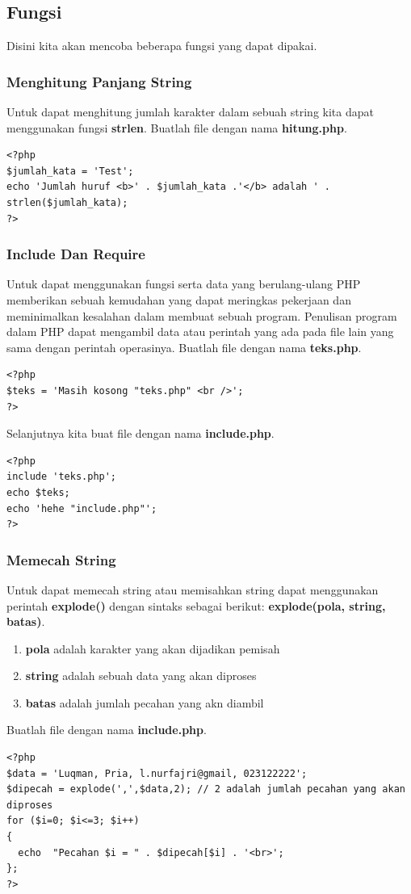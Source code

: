 \subsection{Fungsi}
Disini kita akan mencoba beberapa fungsi yang dapat dipakai.
\subsubsection{Menghitung Panjang String}
Untuk dapat menghitung jumlah karakter dalam sebuah string kita dapat menggunakan fungsi \textbf{strlen}. Buatlah file dengan nama \textbf{hitung.php}.
\begin{lstlisting}
<?php
$jumlah_kata = 'Test';
echo 'Jumlah huruf <b>' . $jumlah_kata .'</b> adalah ' . strlen($jumlah_kata);
?>
\end{lstlisting}

\subsubsection{Include Dan Require}
Untuk dapat menggunakan fungsi serta data yang berulang-ulang PHP memberikan sebuah kemudahan yang dapat meringkas pekerjaan dan meminimalkan kesalahan dalam membuat sebuah program. Penulisan program dalam PHP dapat mengambil data atau perintah yang ada pada file lain yang sama dengan perintah operasinya. Buatlah file dengan nama \textbf{teks.php}.
\begin{lstlisting}
<?php
$teks = 'Masih kosong "teks.php" <br />';
?> 
\end{lstlisting}
Selanjutnya kita buat file dengan nama \textbf{include.php}.
\begin{lstlisting}
<?php
include 'teks.php';
echo $teks;
echo 'hehe "include.php"';
?>
\end{lstlisting}

\subsubsection{Memecah String}
Untuk dapat memecah string atau memisahkan string dapat menggunakan perintah \textbf{explode()} dengan sintaks sebagai berikut: \textbf{explode(pola, string, batas)}. 
\begin{enumerate}
\item \textbf{pola} adalah karakter yang akan dijadikan pemisah
\item \textbf{string} adalah sebuah data yang akan diproses
\item \textbf{batas} adalah jumlah pecahan yang akn diambil
\end{enumerate}
Buatlah file dengan nama \textbf{include.php}.
\begin{lstlisting}
<?php
$data = 'Luqman, Pria, l.nurfajri@gmail, 023122222';
$dipecah = explode(',',$data,2); // 2 adalah jumlah pecahan yang akan diproses
for ($i=0; $i<=3; $i++)
{
  echo  "Pecahan $i = " . $dipecah[$i] . '<br>';
};
?>
\end{lstlisting}

